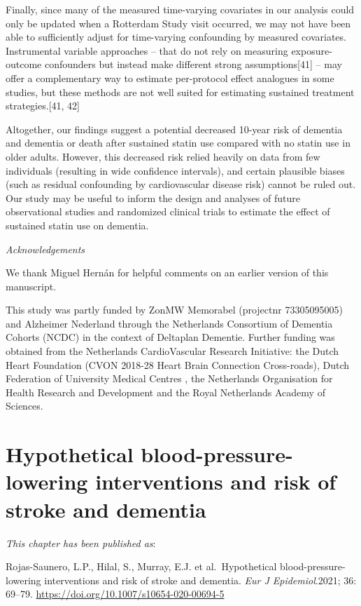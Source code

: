 \documentclass[
]{book}
\begin{document}
Finally, since many of the measured time-varying covariates in our analysis could only be
updated when a Rotterdam Study visit occurred, we may not have been able to sufficiently adjust for time-varying confounding by measured covariates. Instrumental variable approaches -- that do not rely on measuring exposure-outcome confounders but instead make different strong assumptions{[}41{]} -- may offer a complementary way to estimate per-protocol effect analogues in some studies, but these methods are not well suited for estimating sustained treatment strategies.{[}41, 42{]}

Altogether, our findings suggest a potential decreased 10-year risk of dementia and dementia or death after sustained statin use compared with no statin use in older adults. However, this decreased risk relied heavily on data from few individuals (resulting in wide confidence intervals), and certain plausible biases (such as residual confounding by cardiovascular disease risk) cannot be ruled out. Our study may be useful to inform the design and analyses of future observational studies and randomized clinical trials to estimate the effect of sustained statin use on dementia.

\emph{Acknowledgements}

We thank Miguel Hernán for helpful comments on an earlier version of this manuscript.

This study was partly funded by ZonMW Memorabel (projectnr 73305095005) and Alzheimer Nederland through the Netherlands Consortium of Dementia Cohorts (NCDC) in the context of Deltaplan Dementie. Further funding was obtained from the Netherlands CardioVascular Research Initiative: the Dutch Heart Foundation (CVON 2018-28 Heart Brain Connection Cross-roads), Dutch Federation of University Medical Centres , the Netherlands Organisation for Health Research and Development and the Royal Netherlands Academy of Sciences.

\hypertarget{chapter3}{%
\chapter{Hypothetical blood-pressure-lowering interventions and risk of stroke and dementia}\label{chapter3}}

\small

\noindent
\emph{This chapter has been published as}:

Rojas-Saunero, L.P., Hilal, S., Murray, E.J. et al.~Hypothetical blood-pressure-lowering interventions and risk of stroke and dementia. \emph{Eur J Epidemiol}.2021; 36: 69--79. \url{https://doi.org/10.1007/s10654-020-00694-5}
\newpage
\normalsize
\end{document}
